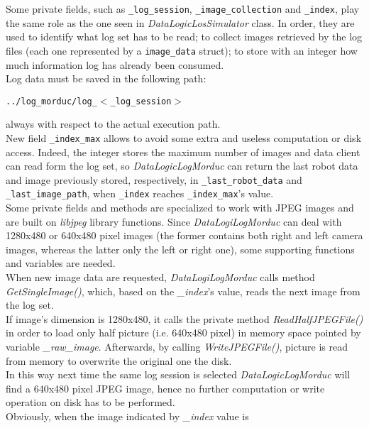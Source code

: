 Some private fields, such as
\texttt{\_log\_session}, \texttt{\_image\_collection}
and \texttt{\_index}, play
the same role as the one seen in \textit{DataLogicLosSimulator}
class. In order, they are used to identify what log set has
to be read; to collect images retrieved by the log files (each
one represented by a \texttt{image\_data} struct);
to store with an integer how much information log has already
been consumed.
\\
Log data must be saved in the following path:

\begin{center}
  \texttt{../log\_morduc/log\_$<$\_log\_session$>$}
\end{center}

always with respect to the actual execution path.
\\
New field \texttt{\_index\_max} allows to avoid some extra and
useless computation or disk access. Indeed, the integer stores
the maximum number
of images and data client can read form the log set, so
\textit{DataLogicLogMorduc}  can
return the last robot data and image previously stored, respectively,
in \texttt{\_last\_robot\_data} and \texttt{\_last\_image\_path},
when \texttt{\_index}
reaches \texttt{\_index\_max}'s value.
\\
Some private fields and methods are specialized to work with JPEG
images and are built on \textit{libjpeg} library functions.
Since \textit{DataLogiLogMorduc} can deal with 1280x480
or 640x480 pixel images (the former contains both right and left
camera images, whereas the latter only the left or right one),
some supporting functions and variables are needed.
\\
When new image data are requested, \textit{DataLogiLogMorduc}
calls method \textit{GetSingleImage()}, which, based on the
\textit{\_index}'s value, reads the next image from the log set.
\\
If image's dimension is 1280x480, it calls the private method
\textit{ReadHalfJPEGFile()} in order to load only half 
picture (i.e. 640x480 pixel) in memory space pointed by variable
\textit{\_raw\_image}. Afterwards, by calling \textit{WriteJPEGFile()},
picture is read from memory to overwrite the original one the disk.
\\
In this way next time the same log session is selected \textit{DataLogicLogMorduc}
will find a 640x480 pixel JPEG image, hence no further computation
or write operation on disk has to be performed.
\\
Obviously, when the image indicated by \textit{\_index} value is
